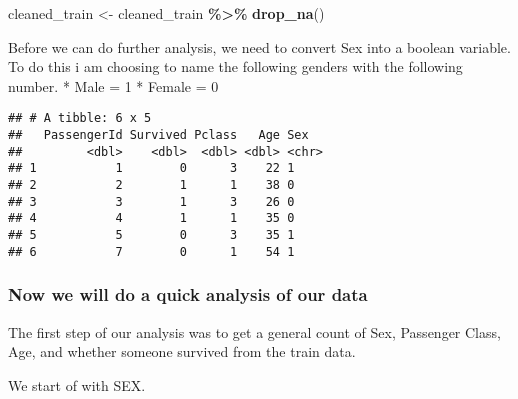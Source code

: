 \documentclass[
]{article}
\newenvironment{Shaded}{\begin{snugshade}}{\end{snugshade}}
\newcommand{\DecValTok}[1]{\textcolor[rgb]{0.00,0.00,0.81}{#1}}
\newcommand{\FunctionTok}[1]{\textcolor[rgb]{0.13,0.29,0.53}{\textbf{#1}}}
\newcommand{\NormalTok}[1]{#1}
\newcommand{\OtherTok}[1]{\textcolor[rgb]{0.56,0.35,0.01}{#1}}
\newcommand{\SpecialCharTok}[1]{\textcolor[rgb]{0.81,0.36,0.00}{\textbf{#1}}}
\newcommand{\StringTok}[1]{\textcolor[rgb]{0.31,0.60,0.02}{#1}}
\begin{document}
\begin{Shaded}
\begin{Highlighting}[]
\NormalTok{cleaned\_train }\OtherTok{\textless{}{-}}\NormalTok{ cleaned\_train }\SpecialCharTok{\%\textgreater{}\%} 
  \FunctionTok{drop\_na}\NormalTok{()}
\end{Highlighting}
\end{Shaded}

Before we can do further analysis, we need to convert Sex into a boolean
variable. To do this i am choosing to name the following genders with
the following number. * Male = 1 * Female = 0

\begin{Shaded}
\end{Shaded}

\begin{verbatim}
## # A tibble: 6 x 5
##   PassengerId Survived Pclass   Age Sex  
##         <dbl>    <dbl>  <dbl> <dbl> <chr>
## 1           1        0      3    22 1    
## 2           2        1      1    38 0    
## 3           3        1      3    26 0    
## 4           4        1      1    35 0    
## 5           5        0      3    35 1    
## 6           7        0      1    54 1
\end{verbatim}

\hypertarget{now-we-will-do-a-quick-analysis-of-our-data}{%
\subsubsection{\texorpdfstring{\textbf{Now we will do a quick analysis
of our
data}}{Now we will do a quick analysis of our data}}\label{now-we-will-do-a-quick-analysis-of-our-data}}

The first step of our analysis was to get a general count of Sex,
Passenger Class, Age, and whether someone survived from the train data.

We start of with SEX.
\end{document}
